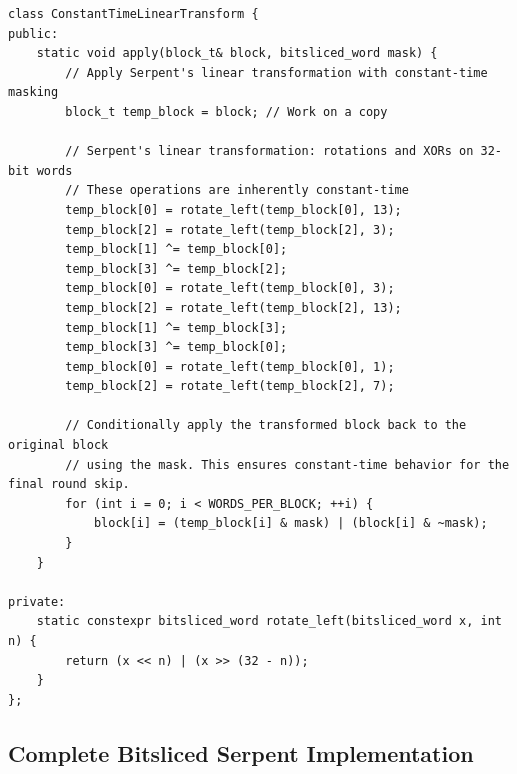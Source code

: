 \documentclass[12pt,a4paper]{article}
\begin{document}
\begin{lstlisting}[caption=Constant-Time Linear Transformation]
class ConstantTimeLinearTransform {
public:
    static void apply(block_t& block, bitsliced_word mask) {
        // Apply Serpent's linear transformation with constant-time masking
        block_t temp_block = block; // Work on a copy
        
        // Serpent's linear transformation: rotations and XORs on 32-bit words
        // These operations are inherently constant-time
        temp_block[0] = rotate_left(temp_block[0], 13);
        temp_block[2] = rotate_left(temp_block[2], 3);
        temp_block[1] ^= temp_block[0];
        temp_block[3] ^= temp_block[2];
        temp_block[0] = rotate_left(temp_block[0], 3);
        temp_block[2] = rotate_left(temp_block[2], 13);
        temp_block[1] ^= temp_block[3];
        temp_block[3] ^= temp_block[0];
        temp_block[0] = rotate_left(temp_block[0], 1);
        temp_block[2] = rotate_left(temp_block[2], 7);

        // Conditionally apply the transformed block back to the original block
        // using the mask. This ensures constant-time behavior for the final round skip.
        for (int i = 0; i < WORDS_PER_BLOCK; ++i) {
            block[i] = (temp_block[i] & mask) | (block[i] & ~mask);
        }
    }

private:
    static constexpr bitsliced_word rotate_left(bitsliced_word x, int n) {
        return (x << n) | (x >> (32 - n));
    }
};
\end{lstlisting}

\subsection{Complete Bitsliced Serpent Implementation}
\end{document}
